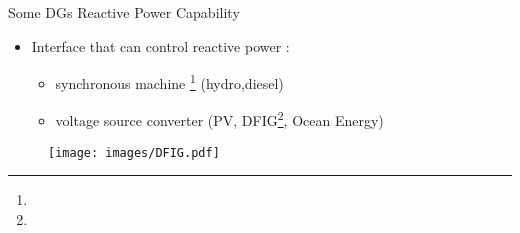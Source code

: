 \documentclass[10pt]{beamer}
\begin{document}




\begin{frame}{Some DGs Reactive Power Capability }
\begin{itemize}
\item Interface that can control reactive power :

	\begin{itemize}
		\item  synchronous machine \footnote{} (hydro,diesel) 
		\item  voltage source converter (PV, DFIG\footnote{}, Ocean Energy)
	\end{itemize}

\end{itemize}

\begin{figure}
	\centering
		\texttt{[image: images/DFIG.pdf]}
	\label{fig:DFIG}
\end{figure}

\end{frame}
\end{document}
